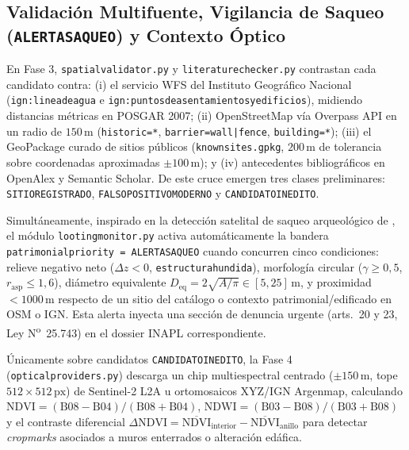 \documentclass[11pt,a4paper]{article}
\DeclareRobustCommand{\_}{\ifmmode\mbox{\textunderscore}\else\textunderscore\allowbreak\fi}
\begin{document}
\subsection{Validaci\'on Multifuente, Vigilancia de Saqueo (\texttt{ALERTA\_SAQUEO}) y Contexto \'Optico}

En Fase 3, \texttt{spatial\_validator.py} y \texttt{literature\_checker.py} contrastan cada candidato contra: (i) el servicio WFS del Instituto Geogr\'afico Nacional (\texttt{ign:linea\_de\_agua} e \texttt{ign:puntos\_de\_asentamientos\_y\_edificios}), midiendo distancias m\'etricas en POSGAR 2007; (ii) OpenStreetMap v\'ia Overpass API en un radio de $150\,\mathrm{m}$ (\texttt{historic=*}, \texttt{barrier=wall|fence}, \texttt{building=*}); (iii) el GeoPackage curado de sitios p\'ublicos (\texttt{known\_sites.gpkg}, $200\,\mathrm{m}$ de tolerancia sobre coordenadas aproximadas $\pm 100\,\mathrm{m}$); y (iv) antecedentes bibliogr\'aficos en OpenAlex y Semantic Scholar. De este cruce emergen tres clases preliminares: \texttt{SITIO\_REGISTRADO}, \texttt{FALSO\_POSITIVO\_MODERNO} y \texttt{CANDIDATO\_INEDITO}.

Simult\'aneamente, inspirado en la detecci\'on satelital de saqueo arqueol\'ogico de \citet{Parcak2016}, el m\'odulo \texttt{looting\_monitor.py} activa autom\'aticamente la bandera \texttt{patrimonial\_priority = \textquotedbl{}ALERTA\_SAQUEO\textquotedbl{}} cuando concurren cinco condiciones: relieve negativo neto ($\Delta z < 0$, \texttt{estructura\_hundida}), morfolog\'ia circular ($\gamma \ge 0{,}5$, $r_{\mathrm{asp}} \le 1{,}6$), di\'ametro equivalente $D_{\mathrm{eq}} = 2\sqrt{A/\pi} \in [5, 25]\,\mathrm{m}$, y proximidad $< 1000\,\mathrm{m}$ respecto de un sitio del cat\'alogo o contexto patrimonial/edificado en OSM o IGN. Esta alerta inyecta una secci\'on de denuncia urgente (arts.\ 20 y 23, Ley N\textsuperscript{o}~25.743) en el dossier INAPL correspondiente.

\'Unicamente sobre candidatos \texttt{CANDIDATO\_INEDITO}, la Fase 4 (\texttt{optical\_providers.py}) descarga un chip multiespectral centrado ($\pm 150\,\mathrm{m}$, tope $512\times 512\,\mathrm{px}$) de Sentinel-2 L2A u ortomosaicos XYZ/IGN Argenmap, calculando $\mathrm{NDVI} = (\mathrm{B08}-\mathrm{B04})/(\mathrm{B08}+\mathrm{B04})$, $\mathrm{NDWI} = (\mathrm{B03}-\mathrm{B08})/(\mathrm{B03}+\mathrm{B08})$ y el contraste diferencial $\Delta\mathrm{NDVI} = \overline{\mathrm{NDVI}}_{\mathrm{interior}} - \overline{\mathrm{NDVI}}_{\mathrm{anillo}}$ para detectar \emph{cropmarks} asociados a muros enterrados o alteraci\'on ed\'afica.
\end{document}
